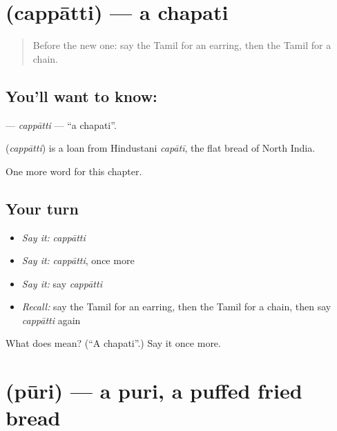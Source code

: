 \section[\texorpdfstring{\ta{சப்பாத்தி} (cappātti)}{சப்பாத்தி (cappātti)}]{ (cappātti) — a chapati}

\label{lesson:TA-C270-cappatti}



\begin{quote}
Before the new one: say the Tamil for an earring, then the Tamil for a chain.
\end{quote}

\subsection*{You'll want to know: }
\textbf{} — \emph{cappātti} — \textquotedblleft{}a chapati\textquotedblright{}.

\begin{cousinweb}
\textbf{} (\emph{cappātti}) is a loan from Hindustani \emph{capātī}, the flat bread of North India.
\end{cousinweb}

\begin{grammarlens}[title={What you've built}]
One more word for this chapter.
\end{grammarlens}

\subsection*{Your turn}
\begin{itemize}
\raggedright
  \item \emph{Say it:} \emph{cappātti}
  \item \emph{Say it:} \emph{cappātti}, once more
  \item \emph{Say it:} say \emph{cappātti}
  \item \emph{Recall:} say the Tamil for an earring, then the Tamil for a chain, then say \emph{cappātti} again
\end{itemize}

\begin{tcolorbox}[breakable,colback=teal!4,colframe=teal!35!black,title={Before you move on}]
What does  mean? (\textquotedblleft{}A chapati\textquotedblright{}.) Say it once more.
\end{tcolorbox}
\section[\texorpdfstring{\ta{பூரி} (pūri)}{பூரி (pūri)}]{ (pūri) — a puri, a puffed fried bread}

